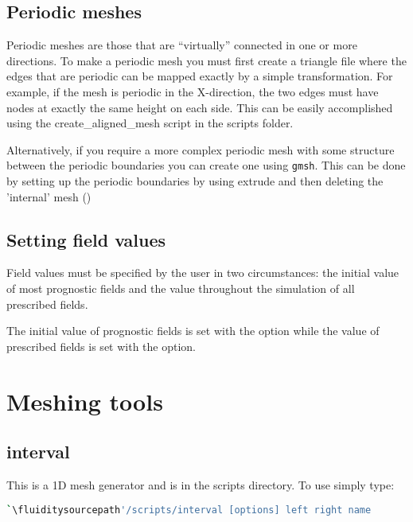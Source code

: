 \subsection{Periodic meshes}
\label{mesh!mesh types!periodic} 
Periodic meshes are those that
are ``virtually'' connected in one or more directions. To make a periodic
mesh you must first create a triangle file where the edges that are periodic
can be mapped exactly by a simple transformation. For example, if the mesh
is periodic in the X-direction, the two edges must have nodes at exactly the
same height on each side. This can be easily accomplished using the
create\_aligned\_mesh script in the scripts folder.

Alternatively, if you require a more complex periodic mesh with some structure between the periodic boundaries you can create one using \lstinline[language=Python]{gmsh}. This can be done by setting up the periodic boundaries by using extrude and then deleting the 'internal' mesh (\website)

\subsection{Setting field values}\label{Sect:setting_field_values}
Field values must be specified by the user in two circumstances: the initial
value of most prognostic fields and the value throughout the simulation of
all prescribed fields. 

The initial value of prognostic fields is set with the
 option while the value of
prescribed fields is set with the  option.

\section{Meshing tools}

\subsection{interval}
This is a 1D mesh generator and is in the scripts directory. To use simply type:


\begin{lstlisting}[language = Bash]
`\fluiditysourcepath'/scripts/interval [options] left right name 
\end{lstlisting}

